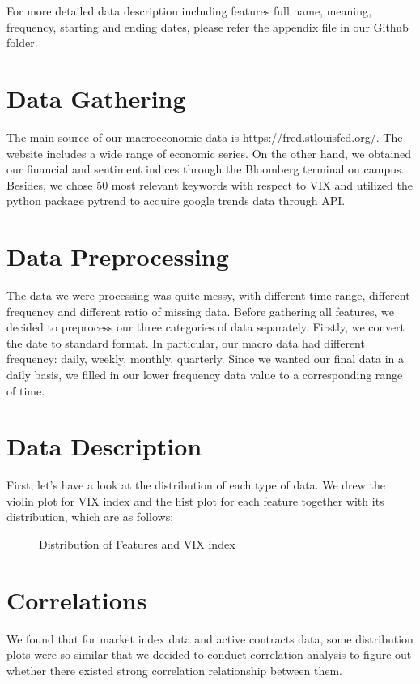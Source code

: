 \documentclass{article}
\begin{document}
For more detailed data description including features full name, meaning, frequency, starting and ending dates, please refer the appendix file in our Github folder. 
 
\section*{Data Gathering}	
The main source of our macroeconomic data is  https://fred.stlouisfed.org/. The website includes a wide range of economic series. On the other hand, we obtained our financial and sentiment indices through the Bloomberg terminal on campus. Besides, we chose 50 most relevant keywords with respect to VIX and utilized the python package pytrend to acquire google trends data through API.
 
\section*{Data Preprocessing}
The data we were processing was quite messy, with different time range, different frequency and different ratio of missing data. Before gathering all features, we decided to preprocess our three categories of data separately. Firstly, we convert the date to standard format. In particular, our macro data had different frequency: daily, weekly, monthly, quarterly. Since we wanted our final data in a daily basis, we filled in our lower frequency data value to a corresponding range of time. 

\section*{Data Description}
First, let's have a look at the distribution of each type of data. We drew the violin plot for VIX index and the hist plot for each feature together with its distribution, which are as follows:

\begin{figure}[h]
\centering
{}
\caption{Distribution of Features and VIX index}
\end{figure}

\section*{Correlations}
We found that for market index data and active contracts data, some distribution plots were so similar that we decided to conduct correlation analysis to figure out whether there existed strong correlation relationship between them. 
\end{document}
